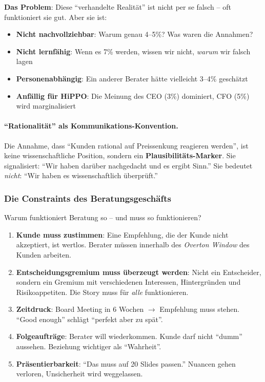 \textbf{Das Problem}: Diese ``verhandelte Realität'' ist nicht per se falsch -- oft funktioniert sie gut. Aber sie ist:
\begin{itemize}
    \item \textbf{Nicht nachvollziehbar}: Warum genau 4--5\%? Was waren die Annahmen?
    \item \textbf{Nicht lernfähig}: Wenn es 7\% werden, wissen wir nicht, \textit{warum} wir falsch lagen
    \item \textbf{Personenabhängig}: Ein anderer Berater hätte vielleicht 3--4\% geschätzt
    \item \textbf{Anfällig für HiPPO}: Die Meinung des CEO (3\%) dominiert, CFO (5\%) wird marginalisiert
\end{itemize}

\paragraph{``Rationalität'' als Kommunikations-Konvention.}
Die Annahme, dass ``Kunden rational auf Preissenkung reagieren werden'', ist keine wissenschaftliche Position, sondern ein \textbf{Plausibilitäts-Marker}. Sie signalisiert: ``Wir haben darüber nachgedacht und es ergibt Sinn.'' Sie bedeutet \textit{nicht}: ``Wir haben es wissenschaftlich überprüft.''

\subsubsection{Die Constraints des Beratungsgeschäfts}

Warum funktioniert Beratung so -- und muss so funktionieren?

\begin{enumerate}
    \item \textbf{Kunde muss zustimmen}: Eine Empfehlung, die der Kunde nicht akzeptiert, ist wertlos. Berater müssen innerhalb des \textit{Overton Window} des Kunden arbeiten.

    \item \textbf{Entscheidungsgremium muss überzeugt werden}: Nicht ein Entscheider, sondern ein Gremium mit verschiedenen Interessen, Hintergründen und Risikoappetiten. Die Story muss für \textit{alle} funktionieren.

    \item \textbf{Zeitdruck}: Board Meeting in 6 Wochen $\rightarrow$ Empfehlung muss stehen. ``Good enough'' schlägt ``perfekt aber zu spät''.

    \item \textbf{Folgeaufträge}: Berater will wiederkommen. Kunde darf nicht ``dumm'' aussehen. Beziehung wichtiger als ``Wahrheit''.

    \item \textbf{Präsentierbarkeit}: ``Das muss auf 20 Slides passen.'' Nuancen gehen verloren, Unsicherheit wird weggelassen.
\end{enumerate}

